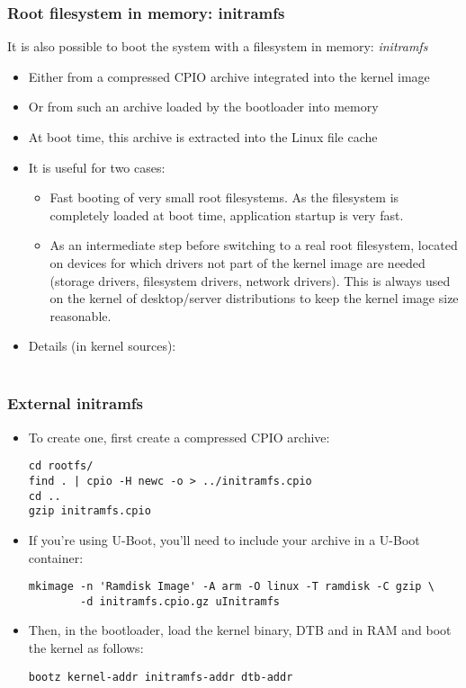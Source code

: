 \begin{frame}
  \frametitle{Root filesystem in memory: initramfs}
  It is also possible to boot the system with a filesystem in memory:
  {\em initramfs}
  \begin{itemize}
  \item Either from a compressed CPIO archive integrated into the kernel image
  \item Or from such an archive loaded by the bootloader into memory
  \item At boot time, this archive is extracted into the Linux file cache
  \item It is useful for two cases:
    \begin{itemize}
    \item Fast booting of very small root filesystems. As the
      filesystem is completely loaded at boot time, application
      startup is very fast.
    \item As an intermediate step before switching to a real root
      filesystem, located on devices for which drivers not part of the
      kernel image are needed (storage drivers, filesystem drivers,
      network drivers). This is always used on the kernel of
      desktop/server distributions to keep the kernel image size
      reasonable.
    \end{itemize}
  \item Details (in kernel sources): \\
    \\
  \end{itemize}
\end{frame}

\begin{frame}[fragile]
  \frametitle{External initramfs}
  \begin{itemize}
  \item To create one, first create a compressed CPIO archive:
 \begin{verbatim}
cd rootfs/
find . | cpio -H newc -o > ../initramfs.cpio
cd ..
gzip initramfs.cpio
\end{verbatim}
  \item If you're using U-Boot, you'll need to include your archive
  in a U-Boot container:
  \begin{verbatim}
mkimage -n 'Ramdisk Image' -A arm -O linux -T ramdisk -C gzip \
        -d initramfs.cpio.gz uInitramfs
\end{verbatim}
  \item Then, in the bootloader, load the kernel binary, DTB and
  \code{uInitramfs} in RAM and boot the kernel as follows:
  \begin{verbatim}
bootz kernel-addr initramfs-addr dtb-addr
\end{verbatim}
  \end{itemize}
\end{frame}

